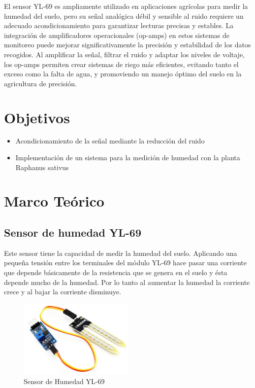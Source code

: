 \documentclass[conference]{IEEEtran}
\begin{document}
	El sensor YL-69 es ampliamente utilizado en aplicaciones agrícolas para medir la humedad del suelo, pero su señal analógica débil y sensible al ruido requiere un adecuado acondicionamiento para garantizar lecturas precisas y estables. La integración de amplificadores operacionales (op-amps) en estos sistemas de monitoreo puede mejorar significativamente la precisión y estabilidad de los datos recogidos. Al amplificar la señal, filtrar el ruido y adaptar los niveles de voltaje, los op-amps permiten crear sistemas de riego más eficientes, evitando tanto el exceso como la falta de agua, y promoviendo un manejo óptimo del suelo en la agricultura de precisión.
	
	\section{Objetivos}
	
	\begin{itemize}
		\item Acondicionamiento de la señal mediante la reducción del ruido
		\item Implementación de un sistema para la medición de humedad con la planta Raphanus sativus
	\end{itemize}
	
	\section{Marco Teórico}
	
	\subsection{ Sensor de humedad YL-69}
	Este sensor tiene la capacidad de medir la humedad del suelo. Aplicando una pequeña tensión entre los terminales del módulo YL-69 hace pasar una corriente que depende básicamente de la resistencia que se genera en el suelo y ésta depende mucho de la humedad. Por lo tanto al aumentar la humedad la corriente crece y al bajar la corriente disminuye.
	\begin{figure}
		\centering
		\includegraphics[width=0.5\textwidth]{media/[YL-69] YL-69 Soil Moisture Hygrometer Detection Humidity Sensor Module For arduino Development Board DIY .jpg}
		\caption{Sensor de Humedad YL-69}
		\label{fig:enter-label}
	\end{figure}
\end{document}

